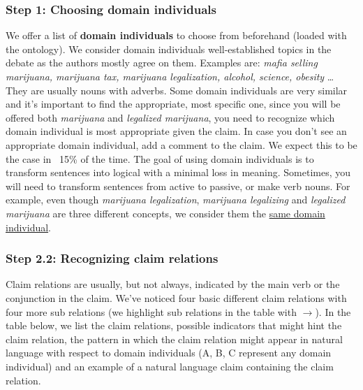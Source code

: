 \subsubsection*{Step 1: Choosing domain individuals}

We offer a list of \textbf{domain individuals} to choose from beforehand (loaded with
the ontology). We consider domain individuals well-established topics in the
debate as the authors mostly agree on them. Examples are: \textit{mafia selling
marijuana, marijuana tax, marijuana legalization, alcohol, science, obesity} \dots
They are usually nouns with adverbs. Some domain individuals are very similar
and it’s important to find the appropriate, most specific one, since you will
be offered both \textit{marijuana} and \textit{legalized marijuana}, you need to recognize which
domain individual is most appropriate given the claim. In case you don’t see an
appropriate domain individual, add a comment to the claim. We expect this to be
the case in ~15\% of the time. The goal of using domain individuals is to
transform sentences into logical with a minimal loss in meaning. Sometimes, you
will need to transform sentences from active to passive, or make verb nouns. 
For example, even though \textit{marijuana legalization}, \textit{marijuana legalizing} and
\textit{legalized marijuana} are three different concepts, we consider them the \underline{same
domain individual}. 

\subsubsection*{Step 2.2: Recognizing claim relations}

Claim relations are usually, but not always, indicated by the main verb or the
conjunction in the claim. We’ve noticed four basic different claim relations
with four more sub relations (we highlight sub relations in the table with
$\rightarrow$). In the table below, we list the claim relations, possible
indicators that might hint the claim relation, the pattern in which the claim
relation might appear in natural language with respect to domain individuals
(A, B, C represent any domain individual) and an example of a natural language
claim containing the claim relation. 

